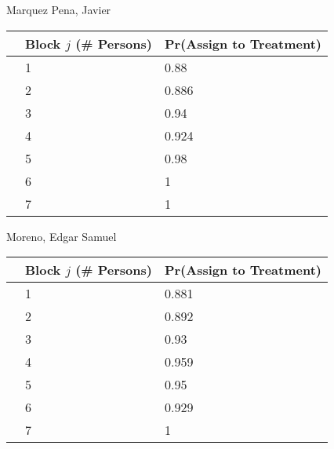 \documentclass[11pt,notitlepage]{article}
\begin{document}
\begin{table}[h!]
\begin{center}
\begin{minipage}[t]{0.45\linewidth}\centering

Marquez Pena, Javier

\begin{tabular}{rll}
  \hline
 & Block $j$ (\# Persons) & Pr(Assign to Treatment) \\ 
  \hline
 & 1 & 0.88 \\ 
 & 2 & 0.886 \\ 
 & 3 & 0.94 \\ 
 & 4 & 0.924 \\ 
 & 5 & 0.98 \\ 
 & 6 & 1 \\ 
 & 7 & 1 \\ 
   \hline
\end{tabular}


\end{minipage}
\hspace{0.5cm}
\begin{minipage}[t]{0.45\linewidth}\centering

Moreno, Edgar Samuel

\begin{tabular}{rll}
  \hline
 & Block $j$ (\# Persons) & Pr(Assign to Treatment) \\ 
  \hline
  & 1 & 0.881 \\ 
  & 2 & 0.892 \\ 
  & 3 & 0.93 \\ 
  & 4 & 0.959 \\ 
  & 5 & 0.95 \\ 
  & 6 & 0.929 \\ 
  & 7 & 1 \\ 
   \hline
\end{tabular}


\end{minipage}
\end{center}
\end{table}
\end{document}
